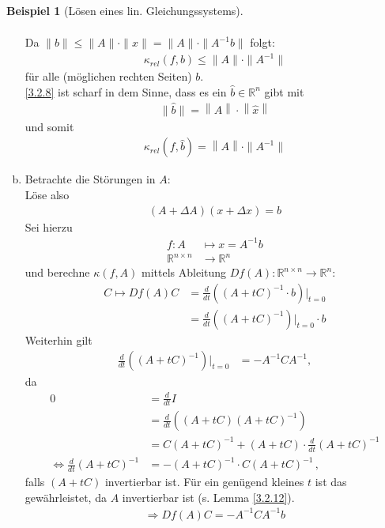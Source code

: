\documentclass[ngerman,fontsize=11pt, paper=a4, parskip=half, titlepage=true, toc=bib]{scrbook}
\theoremstyle{definition}
\newtheorem{Bsp}[Def]{Beispiel}
\theoremstyle{plain}
\newcommand{\R}{\mathds{R}}
\newcommand{\nn}[1]{\left\| #1 \right\|}
\newenvironment{Bspe}[1][]{ %
	\begin{Bsp}[#1]
	}
	{
	\end{Bsp}
	\addtocounter{subsection}{1}
}
\begin{document}
\begin{Bspe}[Lösen eines lin. Gleichungssystems]
\begin{enumerate}[a)]
\begin{align}
		\end{align}
		Da $\|b\| \leq \|A\|\cdot\|x\| = \|A\|\cdot \|A^{-1}b\|$ folgt:
		\begin{gather}
		\kappa_{rel}(f,b) \leq \|A\| \cdot \|A^{-1}\| \label{III.2.8}
		\end{gather}
		für alle (möglichen rechten Seiten) $b $.\\
		\ref{3.2.8} ist scharf in dem Sinne, dass es ein $\widehat{b}\in \R^n$ gibt 
		mit 
		\begin{gather*}
		\|\widehat{b}\| = \nn{A}\cdot \nn{\widehat{x}}
		\end{gather*}
		und somit
		\begin{gather*}
		\kappa_{rel}(f,\widehat{b}) = \nn{A}\cdot \| A^{-1}\|
		\end{gather*} %
		\item Betrachte die Störungen in $A$:\\
		Löse also 
		\begin{gather*}
		(A+\Delta A)(x+\Delta x) = b
		\end{gather*}
		Sei hierzu
		\begin{align*}
		f:A&\mapsto x= A^{-1}b \\
		\R^{n\times n}&\rightarrow \R^n
		\end{align*}
		und berechne $\kappa(f,A)$ mittels Ableitung $Df(A):\R^{n\times n} \rightarrow \R^n$:
		\begin{align*}
		C\mapsto Df(A) C&= \frac{d}{dt} \left((A+tC)^{-1} \cdot b\right) \Big\vert_{t=0} \\
		& = \frac{d}{dt}\left((A+tC)^{-1}\right)\Big\vert_{t=0}\cdot b
		\end{align*}			
		Weiterhin gilt
		\begin{align}
		\frac{d}{dt} \left((A+tC)^{-1}\right) \Big\vert_{t=0} &= -A^{-1}CA^{-1}, \label{III.2.9}
		\end{align}
		da
		\begin{align*}
		0&= \frac{d}{dt}I \\
		&= \frac{d}{dt}\left( (A+tC)(A+tC)^{-1}\right)\\
		&= C(A+tC)^{-1} +(A+tC)\cdot \frac{d}{dt}(A+tC)^{-1} \\
		\Leftrightarrow \frac{d}{dt} (A+ tC)^{-1} 
		&= -(A+tC)^{-1} \cdot C(A+tC)^{-1} \, ,
		\end{align*}
		falls $(A+tC)$ invertierbar ist. Für ein genügend kleines $t$ ist das gewährleistet, da $A$ invertierbar ist (s. Lemma \ref{3.2.12}).
		\begin{gather*}
		\Rightarrow Df(A) C = -A^{-1}CA^{-1}b

\end{gather*}
\end{enumerate}
\end{Bspe}
\end{document}
